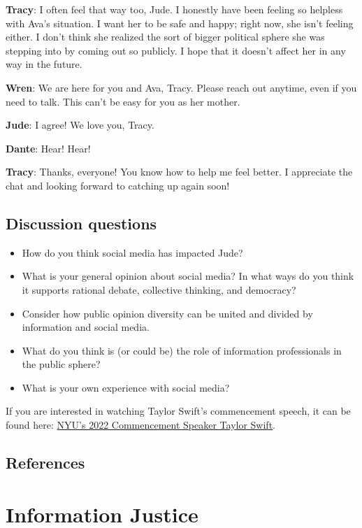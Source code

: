 \documentclass[
  letterpaper,
  DIV=11,
  numbers=noendperiod]{scrreprt}
\begin{document}
\textbf{Tracy}: I often feel that way too, Jude. I honestly have been
feeling so helpless with Ava's situation. I want her to be safe and
happy; right now, she isn't feeling either. I don't think she realized
the sort of bigger political sphere she was stepping into by coming out
so publicly. I hope that it doesn't affect her in any way in the future.

\textbf{Wren}: We are here for you and Ava, Tracy. Please reach out
anytime, even if you need to talk. This can't be easy for you as her
mother.

\textbf{Jude}: I agree! We love you, Tracy.

\textbf{Dante}: Hear! Hear!

\textbf{Tracy}: Thanks, everyone! You know how to help me feel better. I
appreciate the chat and looking forward to catching up again soon!

\section{Discussion questions}\label{discussion-questions-6}

\begin{itemize}
\item
  How do you think social media has impacted Jude?
\item
  What is your general opinion about social media? In what ways do you
  think it supports rational debate, collective thinking, and democracy?
\item
  Consider how public opinion diversity can be united and divided by
  information and social media.
\item
  What do you think is (or could be) the role of information
  professionals in the public sphere?
\item
  What is your own experience with social media?
\end{itemize}

If you are interested in watching Taylor Swift's commencement speech, it
can be found here:
\href{https://www.youtube.com/watch?v=OBG50aoUwlI}{NYU's 2022
Commencement Speaker Taylor Swift}.

\section{References}\label{references-9}


\chapter{Information Justice}\label{information-justice}
\end{document}
